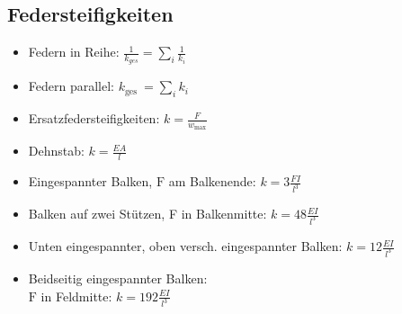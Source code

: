 \documentclass[fleqn,twoside]{article}
\begin{document}
\begin{multicols*}{3}
\subsection{Federsteifigkeiten}
\begin{itemize}
    \item Federn in Reihe: $\frac{1}{k_{ges}}=\sum_i \frac{1}{k_i}$
    \item Federn parallel: $k_{\text {ges }}=\sum_i k_i$
    \item Ersatzfedersteifigkeiten: $k=\frac{F}{w_{\text {max}}}$
    \item Dehnstab: $k=\frac{E A}{l}$
    \item Eingespannter Balken, $\mathrm{F}$ am Balkenende: $k=3 \frac{F I}{l^3}$
    \item Balken auf zwei Stützen, F in Balkenmitte: $k=48 \frac{E I}{l^3}$
    \item Unten eingespannter, oben versch. eingespannter Balken: $k=12 \frac{E I}{l^3}$
    \item Beidseitig eingespannter Balken:\\
    $\mathrm{F}$ in Feldmitte: $k=192 \frac{E I}{l^3}$
\end{itemize}


\end{multicols*}
\end{document}
